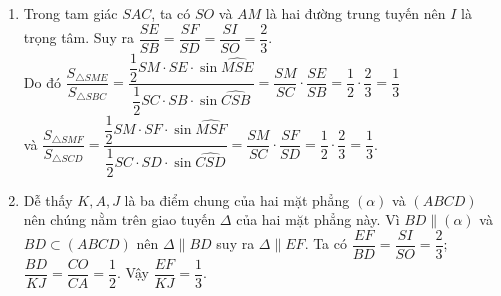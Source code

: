 \begin{bt}
{\begin{enumerate}
			Giao tuyến này cắt $SB$ tại $E$, cắt $SD$ tại $F$.
			\item Trong tam giác $SAC$, ta có $SO$ và $AM$ là hai đường trung tuyến nên $I$ là trọng tâm. Suy ra $\dfrac{SE}{SB}=\dfrac{SF}{SD}=\dfrac{SI}{SO}=\dfrac{2}{3}$. \\
			Do đó $\dfrac{S_{\triangle SME}}{S_{\triangle SBC}}=\dfrac{\dfrac{1}{2}SM\cdot SE\cdot \sin \widehat{MSE}}{\dfrac{1}{2}SC\cdot SB\cdot \sin \widehat{CSB}}=\dfrac{SM}{SC}\cdot \dfrac{SE}{SB}=\dfrac{1}{2}\cdot \dfrac{2}{3}=\dfrac{1}{3}$\\
			và $\dfrac{S_{\triangle SMF}}{S_{\triangle SCD}}=\dfrac{\dfrac{1}{2}SM\cdot SF\cdot \sin \widehat{MSF}}{\dfrac{1}{2}SC\cdot SD\cdot \sin \widehat{CSD}}=\dfrac{SM}{SC}\cdot \dfrac{SF}{SD}=\dfrac{1}{2}\cdot \dfrac{2}{3}=\dfrac{1}{3}$.
			\item Dễ thấy $K,A,J$ là ba điểm chung của hai mặt phẳng $\left(\alpha \right)$ và $(ABCD)$ nên chúng nằm trên giao tuyến $ \Delta $ của hai mặt phẳng này. Vì $BD\parallel \left(\alpha \right)$ và $BD\subset (ABCD)$ nên $ \Delta \parallel BD$ suy ra $ \Delta \parallel EF$. Ta có $\dfrac{EF}{BD}=\dfrac{SI}{SO}=\dfrac{2}{3}$; $\dfrac{BD}{KJ}=\dfrac{CO}{CA}=\dfrac{1}{2}$. Vậy $\dfrac{EF}{KJ}=\dfrac{1}{3}$.
		\end{enumerate}
	}
\end{bt}

